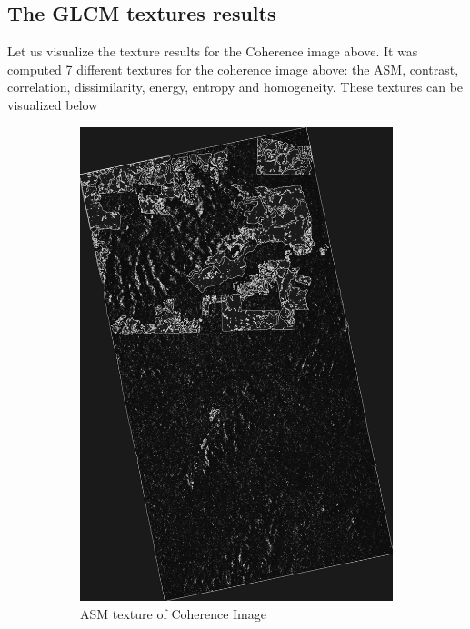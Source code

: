\subsection{The GLCM textures results}
Let us visualize the texture results for the Coherence image above.
It was computed 7 different textures for the coherence image above: the ASM, contrast, correlation, dissimilarity, energy, entropy and homogeneity.
These textures can be visualized below
\newpage
\begin{figure}[H]
  \centering
  \begin{subfigure}[b]{0.4\linewidth}
    \includegraphics[width=\linewidth]{Chapter4/glcm_textures/ASMimage.png}
     \caption{ASM texture of Coherence Image}
  \end{subfigure}
  \begin{subfigure}[b]{0.4\linewidth}

\end{subfigure}
\end{figure}
